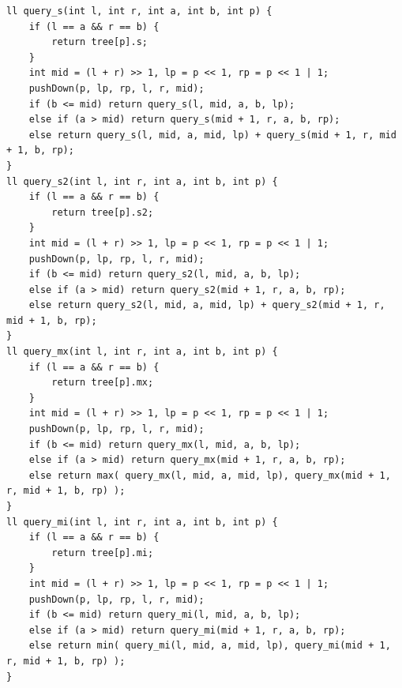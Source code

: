 \documentclass[twocolumn]{article}
\begin{document}
\begin{twocolumn}
\begin{lstlisting}[language={[ANSI]C}]
ll query_s(int l, int r, int a, int b, int p) {
    if (l == a && r == b) {
        return tree[p].s;
    }
    int mid = (l + r) >> 1, lp = p << 1, rp = p << 1 | 1;
    pushDown(p, lp, rp, l, r, mid);
    if (b <= mid) return query_s(l, mid, a, b, lp);
    else if (a > mid) return query_s(mid + 1, r, a, b, rp);
    else return query_s(l, mid, a, mid, lp) + query_s(mid + 1, r, mid + 1, b, rp);
}
ll query_s2(int l, int r, int a, int b, int p) {
    if (l == a && r == b) {
        return tree[p].s2;
    }
    int mid = (l + r) >> 1, lp = p << 1, rp = p << 1 | 1;
    pushDown(p, lp, rp, l, r, mid);
    if (b <= mid) return query_s2(l, mid, a, b, lp);
    else if (a > mid) return query_s2(mid + 1, r, a, b, rp);
    else return query_s2(l, mid, a, mid, lp) + query_s2(mid + 1, r, mid + 1, b, rp);
}
ll query_mx(int l, int r, int a, int b, int p) {
    if (l == a && r == b) {
        return tree[p].mx;
    }
    int mid = (l + r) >> 1, lp = p << 1, rp = p << 1 | 1;
    pushDown(p, lp, rp, l, r, mid);
    if (b <= mid) return query_mx(l, mid, a, b, lp);
    else if (a > mid) return query_mx(mid + 1, r, a, b, rp);
    else return max( query_mx(l, mid, a, mid, lp), query_mx(mid + 1, r, mid + 1, b, rp) );
}
ll query_mi(int l, int r, int a, int b, int p) {
    if (l == a && r == b) {
        return tree[p].mi;
    }
    int mid = (l + r) >> 1, lp = p << 1, rp = p << 1 | 1;
    pushDown(p, lp, rp, l, r, mid);
    if (b <= mid) return query_mi(l, mid, a, b, lp);
    else if (a > mid) return query_mi(mid + 1, r, a, b, rp);
    else return min( query_mi(l, mid, a, mid, lp), query_mi(mid + 1, r, mid + 1, b, rp) );
}

\end{lstlisting}



\end{twocolumn}
\end{document}

